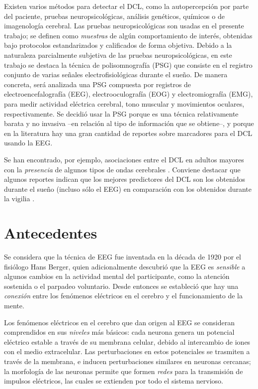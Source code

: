 \documentclass[12pt,letterpaper]{book}
\begin{document}
Existen varios métodos para detectar el DCL, como la autopercepción por parte del paciente, pruebas neuropsicológicas, análisis genéticos, químicos o de imagenología cerebral.
%
Las pruebas neuropsicológicas son usadas en el presente trabajo; se definen como \textit{muestras} de algún comportamiento de interés, obtenidas bajo protocolos estandarizados y calificados de forma objetiva.
%
Debido a la naturaleza parcialmente subjetiva de las pruebas neuropsicológicas, en este trabajo se destaca la técnica de polisomnografía (PSG) que consiste en el registro conjunto de varias señales electrofisiológicas durante el sueño.
%
De manera concreta, será analizada una PSG compuesta por registros de electroencefalografía (EEG), electrooculografía (EOG) y electromiografía (EMG), para medir actividad eléctrica cerebral, tono muscular y movimientos oculares, respectivamente.
%
Se decidió usar la PSG porque es una técnica relativamente barata y no invasiva --en relación al tipo de información que se obtiene--, y porque en la literatura hay una gran cantidad de reportes sobre marcadores para el DCL usando la EEG.

Se han encontrado, por ejemplo, asociaciones entre el DCL en adultos mayores con la \textit{presencia} de algunos tipos de ondas cerebrales \cite{babiloni13,prichep06,prichep94}.
%
Conviene destacar que algunos reportes indican que los mejores predictores del DCL son los obtenidos durante el sueño (incluso sólo el EEG) en comparación con los obtenidos durante la vigilia \cite{Brayet16}.


\section*{Antecedentes}

Se considera que la técnica de EEG fue inventada en la década de 1920 por el fisiólogo Hans Berger, quien adicionalmente descubrió que la EEG es \textit{sensible} a algunos cambios en la actividad mental del participante, como la atención sostenida o el parpadeo voluntario.
%
Desde entonces se estableció que hay una \textit{conexión} entre los fenómenos eléctricos en el cerebro y el funcionamiento de la mente.

Los fenómenos eléctricos en el cerebro que dan origen al EEG se consideran comprendidos en sus \textit{niveles} más básicos: cada neurona genera un potencial eléctrico estable a través de su membrana celular, debido al intercambio de iones con el medio extracelular.
%
Las perturbaciones en estos {potenciales} se trasmiten a través de la membrana, e inducen perturbaciones similares en neuronas cercanas; la morfología de las neuronas permite que formen \textit{redes} para la transmisión de impulsos eléctricos, las cuales se extienden por todo el sistema nervioso.
\end{document}

